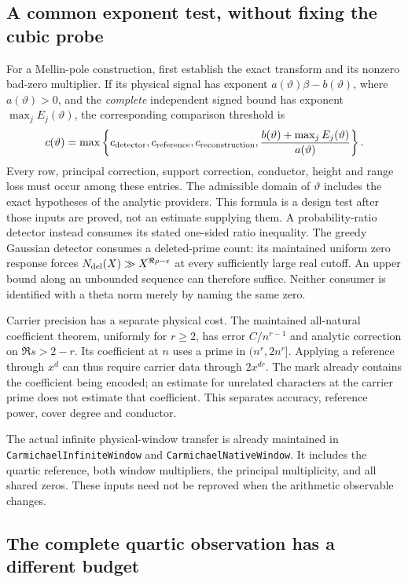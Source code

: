 \documentclass[11pt]{article}
\begin{document}
\subsection{A common exponent test, without fixing the cubic probe}

For a Mellin-pole construction, first establish the exact transform and
its nonzero bad-zero multiplier. If its physical signal has exponent
\(a(\vartheta)\beta-b(\vartheta)\), where \(a(\vartheta)>0\), and the
\emph{complete} independent signed bound has exponent
\(\max_j E_j(\vartheta)\), the corresponding comparison threshold is
\[
 c(\vartheta)=
 \max\left\{c_{\rm detector},c_{\rm reference},c_{\rm reconstruction},
       \frac{b(\vartheta)+\max_j E_j(\vartheta)}{a(\vartheta)}\right\}.
\]
Every row, principal correction, support correction, conductor, height
and range loss must occur among these entries. The admissible domain of
\(\vartheta\) includes the exact hypotheses of the analytic providers.
This formula is a design test after those inputs are proved, not an
estimate supplying them. A probability-ratio detector instead consumes
its stated one-sided ratio inequality. The greedy Gaussian detector
consumes a deleted-prime count: its maintained uniform zero response
forces \(N_{\rm del}(X)\gg X^{\Re\rho-\epsilon}\) at every sufficiently
large real cutoff. An upper bound along an unbounded sequence can
therefore suffice. Neither consumer is identified with a theta norm
merely by naming the same zero.

Carrier precision has a separate physical cost.
The maintained all-natural coefficient theorem, uniformly for
\(r\ge2\), has error \(C/n^{r-1}\) and analytic correction on
\(\Re s>2-r\). Its coefficient at \(n\) uses a prime in
\((n^r,2n^r]\). Applying a reference through \(x^d\) can thus require
carrier data through \(2x^{dr}\). The mark already contains the
coefficient being encoded; an estimate for unrelated characters at the
carrier prime does not estimate that coefficient. This separates
accuracy, reference power, cover degree and conductor.

The actual infinite physical-window transfer is already maintained in
\texttt{CarmichaelInfiniteWindow} and \texttt{CarmichaelNativeWindow}.
It includes the quartic reference, both window multipliers, the
principal multiplicity, and all shared zeros. These inputs need not be
reproved when the arithmetic observable changes.

\subsection{The complete quartic observation has a different budget}
\end{document}
